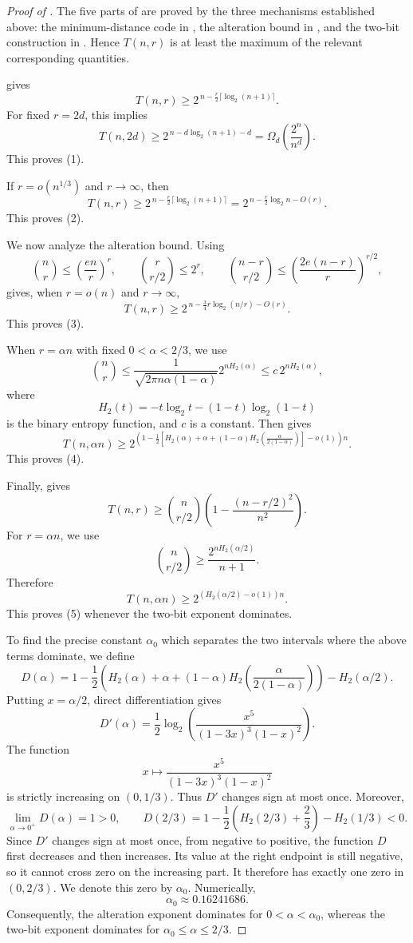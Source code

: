 \documentclass[10pt,a4paper]{amsart}
\begin{document}
\begin{proof}[Proof of ]
The five parts of  are proved by the three mechanisms established above: the minimum-distance code in , the alteration bound in , and the two-bit construction in .
Hence $T(n,r)$ is at least the maximum of the relevant corresponding quantities.

 gives
\[
T(n,r)\ge 2^{\,n-\frac r2\lceil \log_2(n+1)\rceil}.
\]
For fixed $r=2d$, this implies
\[
T(n,2d)
\ge 2^{\,n-d\log_2(n+1)-d}
=
\Omega_d\!\left(\frac{2^n}{n^d}\right).
\]
This proves (1).

If $r=o(n^{1/3})$ and $r\to\infty$, then
\[
T(n,r)\ge 2^{\,n-\frac r2\lceil \log_2(n+1)\rceil}
       =2^{\,n-\frac r2\log_2 n-O(r)}.
\]
This proves (2).

We now analyze the alteration bound.
Using
\[
\binom{n}{r}\le \left(\frac{en}{r}\right)^r,
\qquad
\binom{r}{r/2}\le 2^r,
\qquad
\binom{n-r}{r/2}\le \left(\frac{2e(n-r)}{r}\right)^{r/2},
\]
 gives, when $r=o(n)$ and $r\to\infty$,
\[
T(n,r)
\ge
2^{\,n-\frac{3}{4}r\log_2(n/r)-O(r)}.
\]
This proves (3).

When $r=\alpha n$ with fixed $0<\alpha<2/3$, we use
\[
\binom{n}{r}
\le
\frac{1}{\sqrt{2\pi n\alpha(1-\alpha)}}2^{nH_2(\alpha)}
\le
c\,2^{nH_2(\alpha)},
\]
where
\[
H_2(t)=-t\log_2 t-(1-t)\log_2(1-t)
\]
is the binary entropy function, and $c$ is a constant.
Then  gives
\[
T(n,\alpha n)
\ge
2^{\left(
1-\frac12\left[
H_2(\alpha)+\alpha+(1-\alpha)H_2\!\left(\frac{\alpha}{2(1-\alpha)}\right)
\right]
-o(1)\right)n}.
\]
This proves (4).

Finally,  gives
\[
T(n,r)
\ge
\binom{n}{r/2}\left(1-\frac{(n-r/2)^2}{n^2}\right).
\]
For $r=\alpha n$, we use
\[
\binom{n}{r/2}
\ge
\frac{2^{nH_2(\alpha/2)}}{n+1}.
\]
Therefore
\[
T(n,\alpha n)\ge 2^{(H_2(\alpha/2)-o(1))n}.
\]
This proves (5) whenever the two-bit exponent dominates.

To find the precise constant $\alpha_0$ which separates the two intervals where the above terms dominate, we define
\[
D(\alpha)
=
1-\frac12\left(
H_2(\alpha)+\alpha
+(1-\alpha)H_2\!\left(\frac{\alpha}{2(1-\alpha)}\right)
\right)
-H_2(\alpha/2).
\]
Putting $x=\alpha/2$, direct differentiation gives
\[
D'(\alpha)
=
\frac12\log_2\left(
\frac{x^5}{(1-3x)^3(1-x)^2}
\right).
\]
The function
\[
x\longmapsto
\frac{x^5}{(1-3x)^3(1-x)^2}
\]
is strictly increasing on $(0,1/3)$. Thus $D'$ changes sign at
most once. 
Moreover,
\[
\lim_{\alpha\to0^+}D(\alpha)=1>0,
\qquad
D(2/3)
=
1-\frac12\left(H_2(2/3)+\frac23\right)
-H_2(1/3)
<0.
\]
Since $D'$ changes sign at most once, from negative to positive,
the function $D$ first decreases and then increases. Its value at
the right endpoint is still negative, so it cannot cross zero on
the increasing part. It therefore has exactly one zero in
$(0,2/3)$.
We denote this zero by
$\alpha_0$. Numerically,
\[
\alpha_0\approx0.16241686.
\]
Consequently, the alteration exponent dominates for
$0<\alpha<\alpha_0$, whereas the two-bit exponent dominates for
$\alpha_0\le\alpha\le2/3$.

\end{proof}
\end{document}
